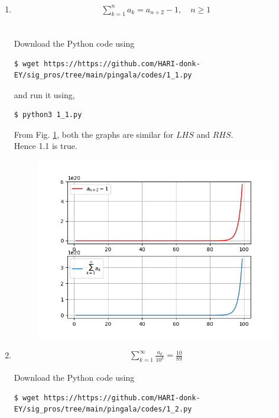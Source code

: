 \documentclass[journal,12pt,twocolumn]{IEEEtran}
\renewcommand\thesection{\arabic{section}}
\begin{document}
\begin{enumerate}[label=\thesection.\arabic*,ref=\thesection.\theenumi]
		
	\item
		\begin{align}
	     		\sum_{k=1}^na_k = a_{n+2}-1, \quad n \ge 1
		\end{align}
	
	\solution\\
		Download the Python code using
	
		\begin{lstlisting}
$ wget https://https://github.com/HARI-donk-EY/sig_pros/tree/main/pingala/codes/1_1.py
		\end{lstlisting}
	
		and run it using,
	
		\begin{lstlisting}
$ python3 1_1.py
		\end{lstlisting}
		
		From Fig. \ref{fig:1.1}, both the graphs are similar for $LHS$ and $RHS$.\\ 
		Hence 1.1 is true.

		\begin{figure}[ht]
			\begin{center}
				\includegraphics[width=0.7\columnwidth]{figs/1_1}
			\end{center}
			\label{fig:1.1}    
		\end{figure}
			
	\item 
		\begin{align}
	     		\sum_{k=1}^\infty\frac{a_k}{10^k} = \frac{10}{89}
		\end{align}

	\solution
		Download the Python code using
	
		\begin{lstlisting}
$ wget https://https://github.com/HARI-donk-EY/sig_pros/tree/main/pingala/codes/1_2.py
		\end{lstlisting}
	

\end{enumerate}
\end{document}
